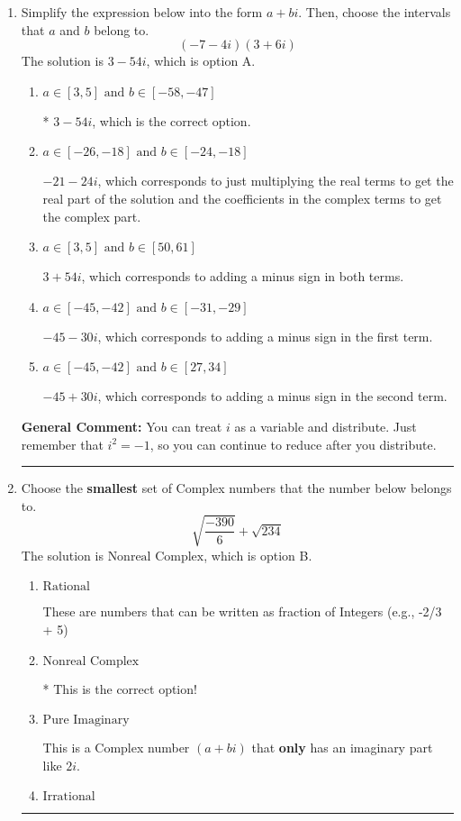 \documentclass{extbook}[14pt]
\newcommand{\litem}[1]{\item #1

\rule{\textwidth}{0.4pt}}
\begin{document}
\begin{enumerate}\litem{
Simplify the expression below into the form $a+bi$. Then, choose the intervals that $a$ and $b$ belong to.
\[ (-7 - 4 i)(3 + 6 i) \]The solution is \( 3 - 54 i \), which is option A.\begin{enumerate}[label=\Alph*.]
\item \( a \in [3, 5] \text{ and } b \in [-58, -47] \)

* $3 - 54 i$, which is the correct option.
\item \( a \in [-26, -18] \text{ and } b \in [-24, -18] \)

 $-21 - 24 i$, which corresponds to just multiplying the real terms to get the real part of the solution and the coefficients in the complex terms to get the complex part.
\item \( a \in [3, 5] \text{ and } b \in [50, 61] \)

 $3 + 54 i$, which corresponds to adding a minus sign in both terms.
\item \( a \in [-45, -42] \text{ and } b \in [-31, -29] \)

 $-45 - 30 i$, which corresponds to adding a minus sign in the first term.
\item \( a \in [-45, -42] \text{ and } b \in [27, 34] \)

 $-45 + 30 i$, which corresponds to adding a minus sign in the second term.
\end{enumerate}

\textbf{General Comment:} You can treat $i$ as a variable and distribute. Just remember that $i^2=-1$, so you can continue to reduce after you distribute.
}
\litem{
Choose the \textbf{smallest} set of Complex numbers that the number below belongs to.
\[ \sqrt{\frac{-390}{6}}+\sqrt{234} \]The solution is \( \text{Nonreal Complex} \), which is option B.\begin{enumerate}[label=\Alph*.]
\item \( \text{Rational} \)

These are numbers that can be written as fraction of Integers (e.g., -2/3 + 5)
\item \( \text{Nonreal Complex} \)

* This is the correct option!
\item \( \text{Pure Imaginary} \)

This is a Complex number $(a+bi)$ that \textbf{only} has an imaginary part like $2i$.
\item \( \text{Irrational} \)


\end{enumerate}}
\end{enumerate}
\end{document}
